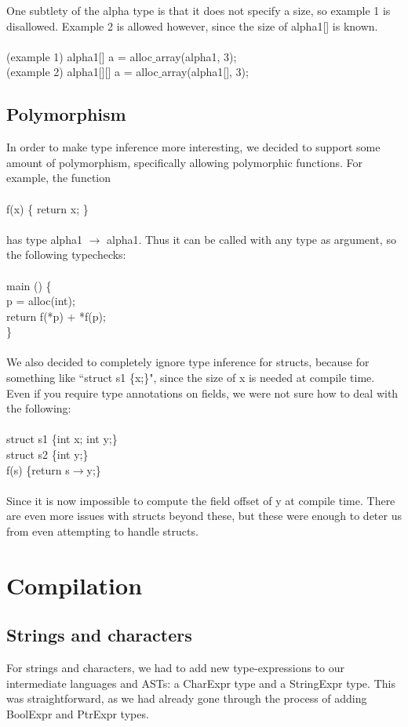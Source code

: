 \documentclass{article}
\begin{document}
One subtlety of the alpha type is that it does not specify a size, so example 1 is disallowed. Example 2 is allowed however, since the size of alpha1[] is known.\\
\\
(example 1) alpha1[] a = alloc$\_$array(alpha1, 3);\\
(example 2) alpha1[][] a = alloc$\_$array(alpha1[], 3);

\subsection{Polymorphism}
In order to make type inference more interesting, we decided to support some amount of polymorphism, specifically allowing polymorphic functions. For example, the function\\
\\
f(x) \{ return x; \}\\
\\
has type alpha1 $\to$ alpha1. Thus it can be called with any type as argument, so the following typechecks:\\
\\
main () \{\\
p = alloc(int);\\
return f(*p) + *f(p);\\
\}\\
\\
We also decided to completely ignore type inference for structs, because for something like ``struct s1 \{x;\}", since the size of x is needed at compile time. Even if you require type annotations on fields, we were not sure how to deal with the following:\\
\\
struct s1 \{int x; int y;\}\\
struct s2 \{int y;\}\\
f(s) \{return s$\to$y;\}\\
\\
Since it is now impossible to compute the field offset of y at compile time. There are even more issues with structs beyond these, but these were enough to deter us from even attempting to handle structs.

\section{Compilation}
\subsection{Strings and characters}
For strings and characters, we had to add new type-expressions to our intermediate languages and ASTs: a CharExpr type and a StringExpr type. This was straightforward, as we had already gone through the process of adding BoolExpr and PtrExpr types.
\end{document}

